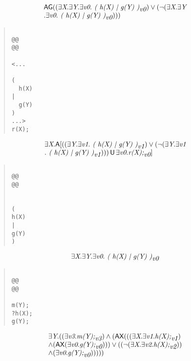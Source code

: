\documentclass{article}
\newcommand{\U}{\,\mbox{\sf{U}}\,}
\newcommand{\A}{\mbox{\sf{A}}}
\newcommand{\AX}{\mbox{\sf{AX}}}
\newcommand{\AG}{\mbox{\sf{AG}}}
\newcommand{\mita}[1]{\mbox{\it{{#1}}}}
\begin{document}
\[\begin{array}{l}
\AG((\exists \mita{X} . \exists \mita{Y} . \exists \mita{v0} . \mita{
(
h(X)
|
g(Y)
)}_{\mita{v0}}) \vee (\neg (\exists \mita{X} . \exists \mita{Y}\\ . \exists \mita{v0} . \mita{
(
h(X)
|
g(Y)
)}_{\mita{v0}})))
\end{array}\]

\begin{quote}\begin{verbatim}

@@
@@

<...
  
(
  h(X)
|
  g(Y)
)
...>
r(X);
\end{verbatim}\end{quote}

\[\begin{array}{l}
\exists \mita{X} . \A[((\exists \mita{Y} . \exists \mita{v1} . \mita{
(
h(X)
|
g(Y)
)}_{\mita{v1}}) \vee (\neg (\exists \mita{Y} . \exists \mita{v1}\\ . \mita{
(
h(X)
|
g(Y)
)}_{\mita{v1}}))) \U \exists \mita{v0} . \mita{r(X);}_{\mita{v0}}]

\end{array}\]

\begin{quote}\begin{verbatim}

@@
@@


(
h(X)
|
g(Y)
)
\end{verbatim}\end{quote}

\[\begin{array}{l}
\exists \mita{X} . \exists \mita{Y} . \exists \mita{v0} . \mita{
(
h(X)
|
g(Y)
)}_{\mita{v0}}
\end{array}\]

\begin{quote}\begin{verbatim}

@@
@@

m(Y);
?h(X);
g(Y);
\end{verbatim}\end{quote}

\[\begin{array}{l}
\exists \mita{Y} . ((\exists \mita{v3} . \mita{m(Y);}_{\mita{v3}}) \wedge (\AX(((\exists \mita{X} . \exists \mita{v1} . \mita{h(X);}_{\mita{v1}})\\ \wedge (\AX(\exists \mita{v0} . \mita{g(Y);}_{\mita{v0}}))) \vee ((\neg (\exists \mita{X} . \exists \mita{v2} . \mita{h(X);}_{\mita{v2}}))\\ \wedge (\exists \mita{v0} . \mita{g(Y);}_{\mita{v0}})))))
\end{array}\]
\end{document}
